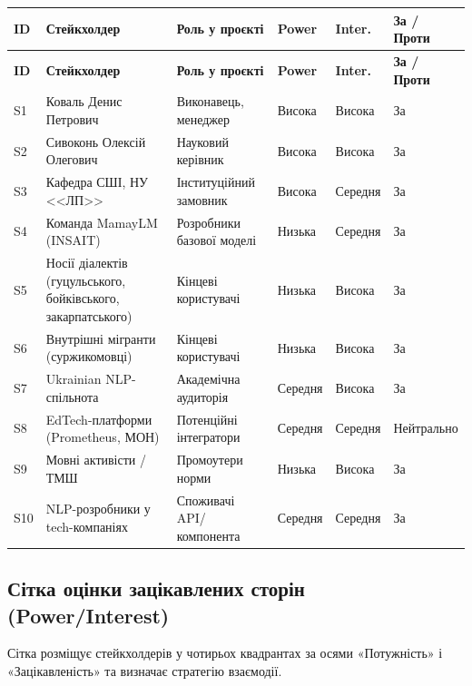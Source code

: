 \documentclass[14pt]{extarticle}
\newcommand{\tabhead}[1]{\textbf{#1}}
\begin{document}
\begin{longtable}{|p{}|p{}|p{}|p{}|p{}|p{}|}
\hline
\tabhead{ID} & \tabhead{Стейк\-холдер} & \tabhead{Роль у проєкті} & \tabhead{Power} & \tabhead{Inter.} & \tabhead{За / Проти} \\
\hline
\endfirsthead
\hline
\tabhead{ID} & \tabhead{Стейк\-холдер} & \tabhead{Роль у проєкті} & \tabhead{Power} & \tabhead{Inter.} & \tabhead{За / Проти} \\
\hline
\endhead
S1 & Коваль Денис Петрович & Виконавець, менеджер & Висока & Висока & За \\
\hline
S2 & Сивоконь Олексій Олегович & Науковий керівник & Висока & Висока & За \\
\hline
S3 & Кафедра СШІ, НУ <<ЛП>> & Інституційний замовник & Висока & Середня & За \\
\hline
S4 & Команда MamayLM (INSAIT) & Розробники базової моделі & Низька & Середня & За \\
\hline
S5 & Носії діалектів (гуцульського, бойківського, закарпатського) & Кінцеві кори\-стувачі & Низька & Висока & За \\
\hline
S6 & Внутрішні мігранти (суржико\-мовці) & Кінцеві кори\-стувачі & Низька & Висока & За \\
\hline
S7 & Ukrainian NLP-спільнота & Академічна аудиторія & Середня & Висока & За \\
\hline
S8 & EdTech-платформи (Prometheus, МОН) & Потенційні інтегратори & Середня & Середня & Нейтрально \\
\hline
S9 & Мовні активісти / ТМШ & Промоутери норми & Низька & Висока & За \\
\hline
S10 & NLP-розробники у tech-ком\-паніях & Спо\-жи\-вачі API/ком\-по\-нен\-та & Середня & Середня & За \\
\hline
\end{longtable}

\subsection{Сітка оцінки зацікавлених сторін (Power/Interest)}

Сітка розміщує стейкхолдерів у чотирьох квадрантах за осями «Потужність» і «Зацікавленість» та визначає стратегію взаємодії.
\end{document}
